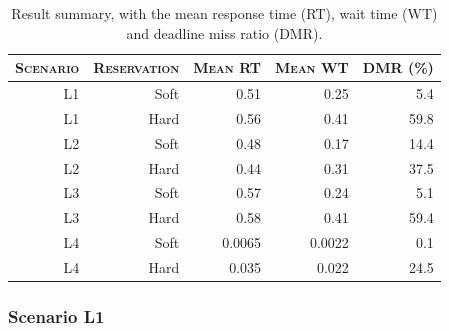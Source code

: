\documentclass[times, 10pt,twocolumn]{article}
\begin{document}
\begin{table}[t]
  \centering
  \begin{tabular}[t]{rrrrr} \hline
    \textsc{Scenario} & \textsc{Reservation} & \textsc{Mean RT} & \textsc{Mean WT} & \textsc{DMR (\%)} \\ \hline
    L1 & Soft & 0.51   & 0.25   & 5.4  \\
    L1 & Hard & 0.56   & 0.41   & 59.8 \\
    L2 & Soft & 0.48   & 0.17   & 14.4 \\
    L2 & Hard & 0.44   & 0.31   & 37.5 \\
    L3 & Soft & 0.57   & 0.24   & 5.1  \\
    L3 & Hard & 0.58   & 0.41   & 59.4 \\
    L4 & Soft & 0.0065 & 0.0022 & 0.1  \\
    L4 & Hard & 0.035  & 0.022  & 24.5 \\ \hline    
  \end{tabular}
  \caption{Result summary, with the mean response time (RT), wait time
  (WT) and deadline miss ratio (DMR).}
  \label{tab:summary}
\end{table}

\subsubsection{Scenario L1}
\label{sec:scenario-l1}
\end{document}
